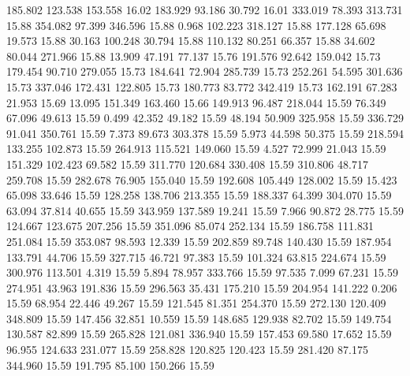  185.802  123.538  153.558        16.02
 183.929   93.186   30.792        16.01
 333.019   78.393  313.731        15.88
 354.082   97.399  346.596        15.88
   0.968  102.223  318.127        15.88
 177.128   65.698   19.573        15.88
  30.163  100.248   30.794        15.88
 110.132   80.251   66.357        15.88
  34.602   80.044  271.966        15.88
  13.909   47.191   77.137        15.76
 191.576   92.642  159.042        15.73
 179.454   90.710  279.055        15.73
 184.641   72.904  285.739        15.73
 252.261   54.595  301.636        15.73
 337.046  172.431  122.805        15.73
 180.773   83.772  342.419        15.73
 162.191   67.283   21.953        15.69
  13.095  151.349  163.460        15.66
 149.913   96.487  218.044        15.59
  76.349   67.096   49.613        15.59
   0.499   42.352   49.182        15.59
  48.194   50.909  325.958        15.59
 336.729   91.041  350.761        15.59
   7.373   89.673  303.378        15.59
   5.973   44.598   50.375        15.59
 218.594  133.255  102.873        15.59
 264.913  115.521  149.060        15.59
   4.527   72.999   21.043        15.59
 151.329  102.423   69.582        15.59
 311.770  120.684  330.408        15.59
 310.806   48.717  259.708        15.59
 282.678   76.905  155.040        15.59
 192.608  105.449  128.002        15.59
  15.423   65.098   33.646        15.59
 128.258  138.706  213.355        15.59
 188.337   64.399  304.070        15.59
  63.094   37.814   40.655        15.59
 343.959  137.589   19.241        15.59
   7.966   90.872   28.775        15.59
 124.667  123.675  207.256        15.59
 351.096   85.074  252.134        15.59
 186.758  111.831  251.084        15.59
 353.087   98.593   12.339        15.59
 202.859   89.748  140.430        15.59
 187.954  133.791   44.706        15.59
 327.715   46.721   97.383        15.59
 101.324   63.815  224.674        15.59
 300.976  113.501    4.319        15.59
   5.894   78.957  333.766        15.59
  97.535    7.099   67.231        15.59
 274.951   43.963  191.836        15.59
 296.563   35.431  175.210        15.59
 204.954  141.222    0.206        15.59
  68.954   22.446   49.267        15.59
 121.545   81.351  254.370        15.59
 272.130  120.409  348.809        15.59
 147.456   32.851   10.559        15.59
 148.685  129.938   82.702        15.59
 149.754  130.587   82.899        15.59
 265.828  121.081  336.940        15.59
 157.453   69.580   17.652        15.59
  96.955  124.633  231.077        15.59
 258.828  120.825  120.423        15.59
 281.420   87.175  344.960        15.59
 191.795   85.100  150.266        15.59
